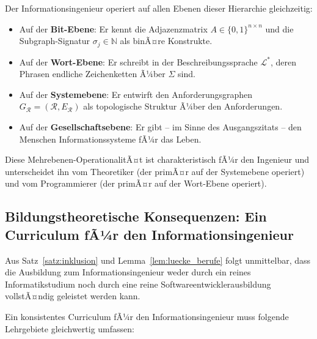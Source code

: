 ﻿\documentclass[a4paper,12pt]{report}
\theoremstyle{definition}
\begin{document}
Der Informationsingenieur operiert auf allen Ebenen dieser Hierarchie gleichzeitig:

\begin{itemize}
  \item Auf der \textbf{Bit-Ebene}: Er kennt die Adjazenzmatrix $A \in \{0,1\}^{n \times n}$
        und die Subgraph-Signatur $\sigma_j \in \mathbb{N}$ als binÃ¤re Konstrukte.
  \item Auf der \textbf{Wort-Ebene}: Er schreibt in der Beschreibungssprache $\mathcal{L}^*$,
        deren Phrasen endliche Zeichenketten Ã¼ber $\Sigma$ sind.
  \item Auf der \textbf{Systemebene}: Er entwirft den Anforderungsgraphen
        $G_\mathcal{R} = (\mathcal{R}, E_\mathcal{R})$ als topologische Struktur
        Ã¼ber den Anforderungen.
  \item Auf der \textbf{Gesellschaftsebene}: Er gibt -- im Sinne des Ausgangszitats --
        den Menschen Informationssysteme fÃ¼r das Leben.
\end{itemize}

Diese Mehrebenen-OperationalitÃ¤t ist charakteristisch fÃ¼r den Ingenieur und unterscheidet
ihn vom Theoretiker (der primÃ¤r auf der Systemebene operiert) und vom Programmierer
(der primÃ¤r auf der Wort-Ebene operiert).

\subsection{Bildungstheoretische Konsequenzen: Ein Curriculum fÃ¼r den Informationsingenieur}

Aus Satz~\ref{satz:inklusion} und Lemma~\ref{lem:luecke_berufe} folgt unmittelbar, dass
die Ausbildung zum Informationsingenieur weder durch ein reines Informatikstudium noch
durch eine reine Softwareentwicklerausbildung vollstÃ¤ndig geleistet werden kann.

Ein konsistentes Curriculum fÃ¼r den Informationsingenieur muss folgende Lehrgebiete
gleichwertig umfassen:
\end{document}
